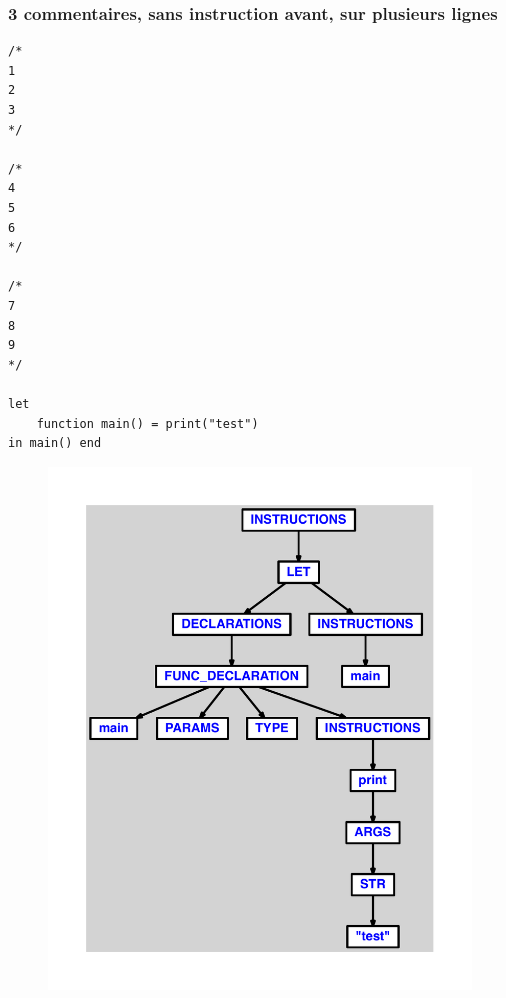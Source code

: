 \documentclass{article}
\begin{document}
\subsubsection{3 commentaires, sans instruction avant, sur plusieurs lignes}
\begin{lstlisting}
/*
1
2
3
*/

/*
4
5
6
*/

/*
7
8
9
*/

let
	function main() = print("test")
in main() end
\end{lstlisting}
\newpage
\begin{figure}[H]
\centering
\includegraphics[max width=\textwidth]{ast/ast_159.pdf}
\end{figure}
\newpage
\end{document}
